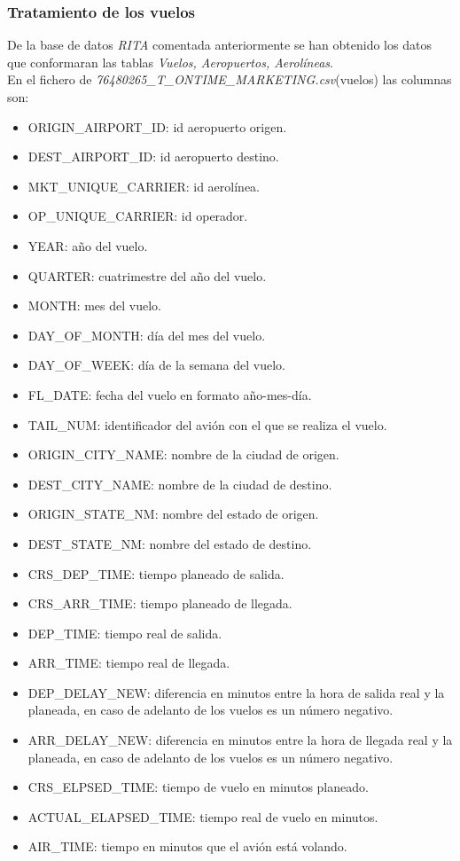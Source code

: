 \documentclass{article}
\begin{document}
\subsubsection{Tratamiento de los vuelos}
De la base de datos \textit{RITA} comentada anteriormente se han obtenido los datos que conformaran las tablas \textit{Vuelos, Aeropuertos, Aerolíneas}.\\
En el fichero de \textit{76480265\_T\_ONTIME\_MARKETING.csv}(vuelos) las columnas son:
    \begin{itemize}
        \item ORIGIN\_AIRPORT\_ID: id aeropuerto origen.
        \item DEST\_AIRPORT\_ID: id aeropuerto destino.
        \item MKT\_UNIQUE\_CARRIER: id aerolínea.
        \item OP\_UNIQUE\_CARRIER: id operador.
        \item YEAR: año del vuelo.
        \item QUARTER: cuatrimestre del año del vuelo.
        \item MONTH: mes del vuelo.
        \item DAY\_OF\_MONTH: día del mes del vuelo.
        \item DAY\_OF\_WEEK: día de la semana del vuelo.
        \item FL\_DATE: fecha del vuelo en formato año-mes-día.
        \item TAIL\_NUM: identificador del avión con el que se realiza el vuelo.
        \item ORIGIN\_CITY\_NAME: nombre de la ciudad de origen.
        \item DEST\_CITY\_NAME: nombre de la ciudad de destino.
        \item ORIGIN\_STATE\_NM: nombre del estado de origen.
        \item DEST\_STATE\_NM: nombre del estado de destino.
        \item CRS\_DEP\_TIME: tiempo planeado de salida.
        \item CRS\_ARR\_TIME: tiempo planeado de llegada.
        \item DEP\_TIME: tiempo real de salida.
        \item ARR\_TIME: tiempo real de llegada.
        \item DEP\_DELAY\_NEW: diferencia en minutos entre la hora de salida real y la planeada, en caso de adelanto de los vuelos es un número negativo.
        \item ARR\_DELAY\_NEW: diferencia en minutos entre la hora de llegada real y la planeada, en caso de adelanto de los vuelos es un número negativo.
        \item CRS\_ELPSED\_TIME: tiempo de vuelo en minutos planeado.
        \item ACTUAL\_ELAPSED\_TIME: tiempo real de vuelo en minutos.
        \item AIR\_TIME: tiempo en minutos que el avión está volando.
    \end{itemize}
    
\end{document}

